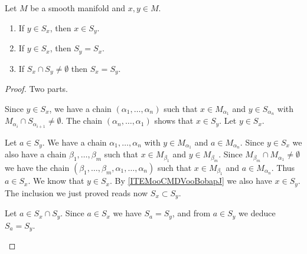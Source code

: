\begin{lemma}		\label{LEMooIFABooVGFYfI}
	Let \( M\) be a smooth manifold and \( x,y\in M\).
	\begin{enumerate}
		\item	\label{ITEMooCMDVooBobapJ}
		      If \( y\in S_x\), then \( x\in S_y\).
		\item		\label{ITEMooIIBSooNNXIFj}
		      If \( y\in S_x\), then \( S_y=S_x\).
		\item		\label{ITEMooNGSEooIZuiMU}
		      If \( S_x\cap S_y\neq\emptyset\) then \( S_x=S_y\).
	\end{enumerate}
\end{lemma}

\begin{proof}
	Two parts.
	\begin{subproof}
		Since \( y\in S_x\), we have a chain \( (\alpha_1,\ldots,\alpha_n)\) such that \( x\in M_{\alpha_1}\) and \( y\in S_{\alpha_n}\) with \( M_{\alpha_i}\cap S_{\alpha_{i+1}}\neq \emptyset\). The chain \( (\alpha_n,\ldots,\alpha_1)\) shows that \( x\in S_y\).
		Let \( y\in S_x\).
		\begin{subproof}
			\spitem[\( S_y\subset S_x\)]
			Let \( a\in S_y\). We have a chain \( \alpha_1,\ldots,\alpha_n\) with \( y\in M_{\alpha_1}\) and \( a\in M_{\alpha_n}\). Since \( y\in S_x\) we also have a chain \( \beta_1,\ldots,\beta_m\) such that \( x\in M_{\beta_1}\) and \( y\in M_{\beta_m}\). Since \( M_{\beta_m}\cap M_{\alpha_1}\neq \emptyset\) we have the chain \( (\beta_1,\ldots,\beta_m,\alpha_1,\ldots,\alpha_n)\) such that \( x\in M_{\beta_1}\) and \( a\in M_{\alpha_n}\). Thus \( a\in S_x\).
			\spitem[\( S_x\subset S_y\)]
			We know that \( y\in S_x\). By \ref{ITEMooCMDVooBobapJ} we also have \( x\in S_y\). The inclusion we just proved reads now \( S_x\subset S_y\).
		\end{subproof}
		Let \( a\in S_x\cap S_y\). Since \( a\in S_x\) we have \( S_a=S_y\), and from \( a\in S_y\) we deduce \( S_a=S_y\).
	\end{subproof}
\end{proof}


